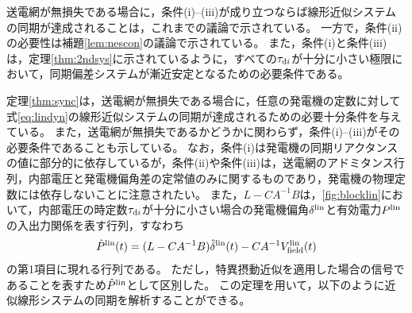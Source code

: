 \documentclass[tombow,dvipdfmx]{corona-a5}
\begin{document}
\begin{証明}
送電網が無損失である場合に，条件(i)--(iii)が成り立つならば線形近似システムの同期が達成されることは，これまでの議論で示されている。
一方で，条件(ii)の必要性は補題\ref{lem:nescon}の議論で示されている。
また，条件(i)と条件(iii)は，定理\ref{thm:2ndsys}に示されているように，すべての$\tau_{{\rm d}i}$が十分に小さい極限において，同期偏差システムが漸近安定となるための必要条件である。
\end{証明}

定理\ref{thm:sync}は，送電網が無損失である場合に，任意の発電機の定数に対して式\ref{eq:lindyn}の線形近似システムの同期が達成されるための必要十分条件を与えている。
また，送電網が無損失であるかどうかに関わらず，条件(i)--(iii)がその必要条件であることも示している。
なお，条件(i)は発電機の同期リアクタンスの値に部分的に依存しているが，条件(ii)や条件(iii)は，送電網のアドミタンス行列，内部電圧と発電機偏角差の定常値のみに関するものであり，発電機の物理定数には依存しないことに注意されたい。
また，$L-CA^{-1}B$は，\ref{fig:blocklin}において，内部電圧の時定数$\tau_{{\rm d}i}$が十分に小さい場合の発電機偏角$\delta^{\rm lin}$と有効電力$P^{\rm lin}$の入出力関係を表す行列，すなわち
\begin{align*}
\hat{P}^{\rm lin}(t) = (L-CA^{-1}B) \hat{\delta}^{\rm lin}(t)
- C A^{-1} V^{\rm lin}_{\rm field}(t)
\end{align*}
の第1項目に現れる行列である。
ただし，特異摂動近似を適用した場合の信号であることを表すため$\hat{P}^{\rm lin}$として区別した。
この定理を用いて，以下のように近似線形システムの同期を解析することができる。
\end{document}
